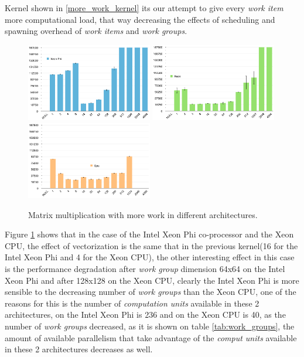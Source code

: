 \par{Kernel shown in \ref{more_work_kernel} its our attempt to give every \emph{work item} more computational load, that way decreasing the
    effects of scheduling and spawning overhead of \emph{work items} and \emph{work groups}.}



\begin{figure}[!h]
    \centering
    \includegraphics[width=0.49\textwidth]{figures/opt1_phi.png}
    \includegraphics[width=0.49\textwidth]{figures/opt1_cpu.png}
    \includegraphics[width=0.49\textwidth]{figures/opt1_gpu.png}
    \caption{Matrix multiplication with more work in different architectures.}
    \label{MoreWork}
\end{figure}

\par{Figure \ref{MoreWork} shows that in the case of the Intel Xeon Phi co-processor and the Xeon CPU, the effect of vectorization
    is the same that in the previous kernel(16 for the Intel Xeon Phi and 4 for the Xeon CPU), the other interesting effect in this
    case is the performance degradation after \emph{work group} dimension 64x64 on the Intel Xeon Phi and after 128x128 on the Xeon
    CPU, clearly the Intel Xeon Phi is more sensible to the decreasing number of \emph{work groups} than the Xeon CPU, one of the 
    reasons for this is the number of \emph{computation units} available in these 2 architectures, on the Intel Xeon Phi is 236 and
    on the Xeon CPU is 40, as the number of \emph{work groups} decreased, as it is shown on table \ref{tab:work_groups}, the amount
    of available parallelism that take advantage of the \emph{comput units} available in these 2 architectures decreases as well.}


